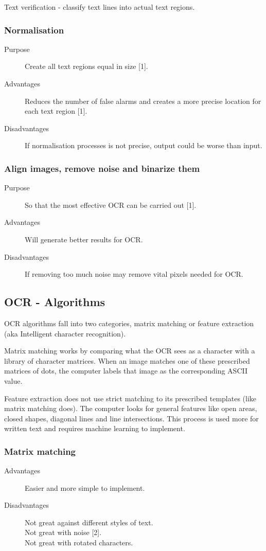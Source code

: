 \documentclass[a4paper,12pt]{article}
\begin{document}
Text verification - classify text lines into actual text regions.
\subsubsection{Normalisation}
\begin{description}
\item[Purpose] Create all text regions equal in size [1].
\item[Advantages] Reduces the number of false alarms and creates a more precise location for each text region [1].
\item[Disadvantages] If normalisation processes is not precise, output could be worse than input.
\end{description}

\subsubsection{Align images, remove noise and binarize them}
\begin{description}
\item[Purpose] So that the most effective OCR can be carried out [1].
\item[Advantages] Will generate better results for OCR.
\item[Disadvantages] If removing too much noise may remove vital pixels needed for OCR.
\end{description}

\subsection{OCR - Algorithms}
OCR algorithms fall into two categories, matrix matching or feature extraction (aka Intelligent character recognition).

Matrix matching works by comparing what the OCR sees as a character with a library of character matrices. When an image matches one of these prescribed matrices of dots, the computer labels that image as the corresponding ASCII value.

Feature extraction does not use strict matching to its prescribed templates (like matrix matching does). The computer looks for general features like open areas, closed shapes, diagonal lines and line intersections. This process is used more for written text and requires machine learning to implement.

\subsubsection{Matrix matching}
\begin{description}
\item[Advantages] Easier and more simple to implement.
\item[Disadvantages] Not great against different styles of text.
\\ Not great with noise [2].
\\ Not great with rotated characters.
\end{description}
\end{document}
